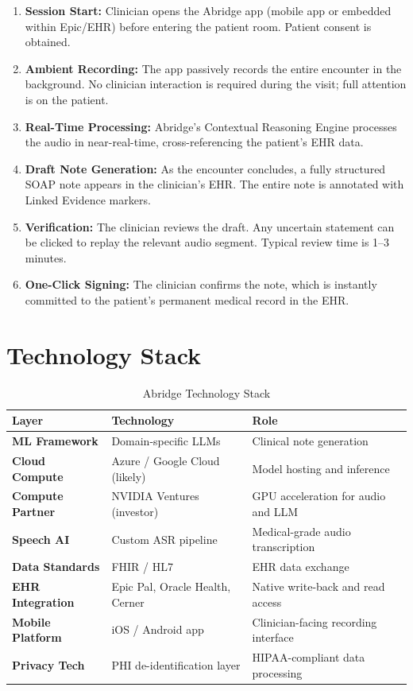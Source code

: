 \documentclass[12pt,a4paper]{article}
\begin{document}
\begin{enumerate}
    \item \textbf{Session Start:} Clinician opens the Abridge app (mobile app or embedded within Epic/EHR) before entering the patient room. Patient consent is obtained.
    \item \textbf{Ambient Recording:} The app passively records the entire encounter in the background. No clinician interaction is required during the visit; full attention is on the patient.
    \item \textbf{Real-Time Processing:} Abridge's Contextual Reasoning Engine processes the audio in near-real-time, cross-referencing the patient's EHR data.
    \item \textbf{Draft Note Generation:} As the encounter concludes, a fully structured SOAP note appears in the clinician's EHR. The entire note is annotated with Linked Evidence markers.
    \item \textbf{Verification:} The clinician reviews the draft. Any uncertain statement can be clicked to replay the relevant audio segment. Typical review time is 1--3 minutes.
    \item \textbf{One-Click Signing:} The clinician confirms the note, which is instantly committed to the patient's permanent medical record in the EHR.
\end{enumerate}

\newpage

\section{Technology Stack}

\begin{table}[H]
\centering
\renewcommand{\arraystretch}{1.4}
\begin{tabularx}{\textwidth}{llX}
\toprule
\textbf{Layer} & \textbf{Technology} & \textbf{Role} \\
\midrule
\textbf{ML Framework} & Domain-specific LLMs & Clinical note generation \\
\textbf{Cloud Compute} & Azure / Google Cloud (likely) & Model hosting and inference \\
\textbf{Compute Partner} & NVIDIA Ventures (investor) & GPU acceleration for audio and LLM \\
\textbf{Speech AI} & Custom ASR pipeline & Medical-grade audio transcription \\
\textbf{Data Standards} & FHIR / HL7 & EHR data exchange \\
\textbf{EHR Integration} & Epic Pal, Oracle Health, Cerner & Native write-back and read access \\
\textbf{Mobile Platform} & iOS / Android app & Clinician-facing recording interface \\
\textbf{Privacy Tech} & PHI de-identification layer & HIPAA-compliant data processing \\
\bottomrule
\end{tabularx}
\caption{Abridge Technology Stack}
\end{table}
\end{document}
